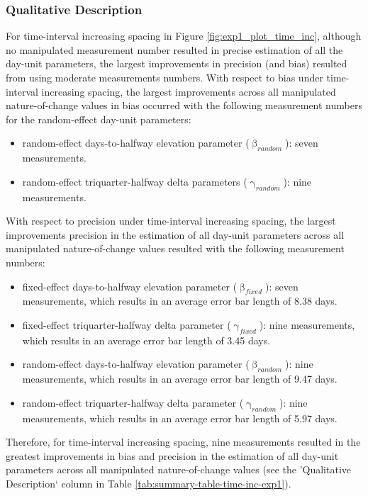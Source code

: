 \documentclass[
12pt, %
twoside,
english]{guelphthesis}
\begin{document}
\hypertarget{qualitative-time-inc-exp1}{%
\subsubsection{Qualitative Description}\label{qualitative-time-inc-exp1}}

For time-interval increasing spacing in Figure \ref{fig:exp1_plot_time_inc}, although no manipulated measurement number resulted in precise estimation of all the day-unit parameters, the largest improvements in precision (and bias) resulted from using moderate measurements numbers. With respect to bias under time-interval increasing spacing, the largest improvements across all manipulated nature-of-change values in bias occurred with the following measurement numbers for the random-effect day-unit parameters:
\begin{itemize}
\tightlist
\item
  random-effect days-to-halfway elevation parameter (\(\upbeta_{random}\)): seven measurements.
\item
  random-effect triquarter-halfway delta parameters (\(\upgamma_{random}\)): nine measurements.
\end{itemize}
\noindent With respect to precision under time-interval increasing spacing, the largest improvements precision in the estimation of all day-unit parameters across all manipulated nature-of-change values resulted with the following measurement numbers:
\begin{itemize}
\tightlist
\item
  fixed-effect days-to-halfway elevation parameter (\(\upbeta_{fixed}\)): seven measurements, which results in an average error bar length of 8.38 days.
\item
  fixed-effect triquarter-halfway delta parameter (\(\upgamma_{fixed}\)): nine measurements, which results in an average error bar length of 3.45 days.
\item
  random-effect days-to-halfway elevation parameter (\(\upbeta_{random}\)): nine measurements, which results in an average error bar length of 9.47 days.
\item
  random-effect triquarter-halfway delta parameter (\(\upgamma_{random}\)): nine measurements, which results in an average error bar length of 5.97 days.
\end{itemize}
\noindent Therefore, for time-interval increasing spacing, nine measurements resulted in the greatest improvements in bias and precision in the estimation of all day-unit parameters across all manipulated nature-of-change values (see the 'Qualitative Description` column in Table \ref{tab:summary-table-time-inc-exp1}).
\end{document}
